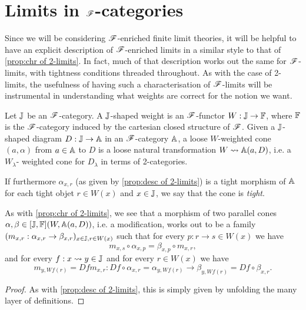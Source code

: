 \documentclass[../thesis.tex]{subfiles}
\begin{document}
\section{Limits in \texorpdfstring{${\mathscr{F}}$}{F}-categories}
Since we will be considering ${\mathscr{F}}$-enriched finite limit theories, it will be helpful to have an
explicit description of ${\mathscr{F}}$-enriched limits in a similar style to that of \cref{prop:chr of 2-limits}.
In fact, much of that description works out the same for ${\mathscr{F}}$-limits, with tightness conditions
threaded throughout. As with the case of 2-limits, the usefulness of having such a characterisation
of ${\mathscr{F}}$-limits will be instrumental in understanding what weights are correct for the notion we
want.

\begin{proposition}
  Let ${\mathbb{J}}$ be an ${\mathscr{F}}$-category. A ${\mathbb{J}}$-shaped weight is an ${\mathscr{F}}$-functor $W : {\mathbb{J}} \to {\mathbb{F}}$, where
  ${\mathbb{F}}$ is the ${\mathscr{F}}$-category induced by the cartesian closed structure of ${\mathscr{F}}$. Given a ${\mathbb{J}}$-shaped
  diagram $D : {\mathbb{J}} \to {\mathbb{A}}$ in an ${\mathscr{F}}$-category ${\mathbb{A}}$, a loose $W$-weighted cone $(a,\alpha)$
  from $a \in {\mathbb{A}}$ to $D$ is a loose natural transformation $W \rightsquigarrow {\mathbb{A}}(a,D)$, i.e. a $W_\lambda$-%
  weighted cone for $D_\lambda$ in terms of 2-categories.

  If furthermore $\alpha_{x,r}$ (as given by \cref{prop:desc of 2-limits}) is a tight morphism of ${\mathbb{A}}$
  for each tight objet $r \in W(x)$ and $x \in {\mathbb{J}}$, we say that the cone is \emph{tight}. 
  
  As with \cref{prop:chr of 2-limits}, we see that a morphism of two parallel cones $\alpha,\beta \in
  [{\mathbb{J}},{\mathbb{F}}](W,{\mathbb{A}}(a,D))$, i.e. a modification, works out to be a family $(m_{x,r} : \alpha_{x,r} \to
  \beta_{x,r})_{x \in {\mathbb{J}}, r \in W(x)}$ such that for every $p : r \to s \in W(x)$ we have
  \[m_{x,s} \circ \alpha_{x,p} = \beta_{x,p} \circ m_{x,r},\]
  and for every $f : x \rightsquigarrow y \in {\mathbb{J}}$ and for every $r \in W(x)$ we have
  \[m_{y,Wf(r)} = Df m_{x,r} : Df \circ \alpha_{x,r} = \alpha_{y,Wf(r)} \to \beta_{y,Wf(r)}
  = Df \circ \beta_{x,r}.\]
\end{proposition}
\begin{proof}
  As with \cref{prop:desc of 2-limits}, this is simply given by unfolding the many layer of definitions.
\end{proof}
\end{document}
